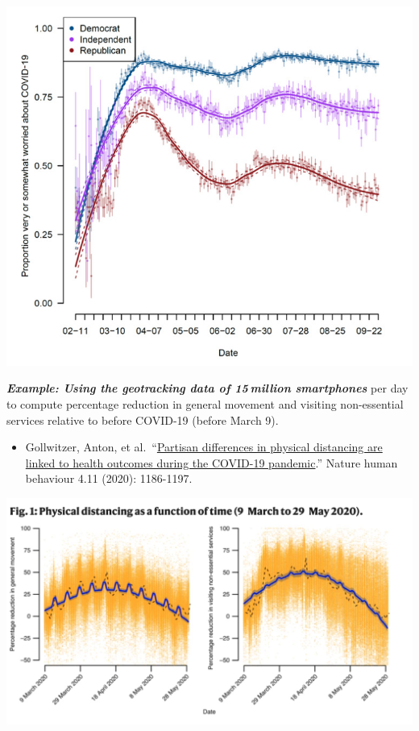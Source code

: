 \documentclass[
  letterpaper,
  DIV=11,
  numbers=noendperiod]{scrreprt}
\providecommand{\tightlist}{%
  \setlength{\itemsep}{0pt}\setlength{\parskip}{0pt}}\usepackage{longtable,booktabs,array}
\begin{document}
\includegraphics{images/covidsurvey.png}

\textbf{\emph{Example: Using the geotracking data of 15 million
smartphones}} per day to compute percentage reduction in general
movement and visiting non-essential services relative to before COVID-19
(before March 9).

\begin{itemize}
\tightlist
\item
  Gollwitzer, Anton, et
  al.~``\href{https://www.nature.com/articles/s41562-020-00977-7}{Partisan
  differences in physical distancing are linked to health outcomes
  during the COVID-19 pandemic}.'' Nature human behaviour 4.11 (2020):
  1186-1197.
\end{itemize}

\includegraphics{images/covidphone.png}
\end{document}

